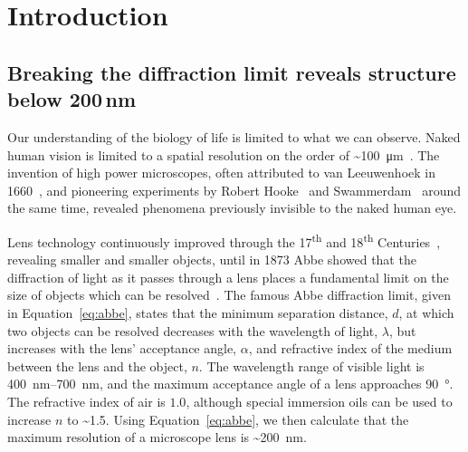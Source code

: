 
\chapter{Introduction}  %

\ifpdf
    \graphicspath{{Chapter1/Figs/Raster/}{Chapter1/Figs/PDF/}{Chapter1/Figs/}}
\else
    \graphicspath{{Chapter1/Figs/Vector/}{Chapter1/Figs/}}
\fi

\section{Breaking the diffraction limit reveals structure below 200\,nm}
Our understanding of the biology of life is limited to what we can observe. 
Naked human vision is limited to a spatial resolution on the order of \textasciitilde\SI{100}{\micro\metre}~\cite{devalois1990spatial}.
The invention of high power microscopes, often attributed to van Leeuwenhoek in 1660~\cite{van1800select}, and pioneering experiments by Robert Hooke~\cite{hooke1667micrographia} and Swammerdam~\cite{swammerdam1758book} around the same time, revealed phenomena previously invisible to the naked human eye. 

Lens technology continuously improved through the 17\textsuperscript{th} and 18\textsuperscript{th} Centuries~\cite{dollond1753xiv, daumas1972scientific}, revealing smaller and smaller objects, until in 1873 Abbe showed that the diffraction of light as it passes through a lens places a fundamental limit on the size of objects which can be resolved~\cite{abbe1873beitrage}. The famous Abbe diffraction limit, given in Equation~\ref{eq:abbe}, states that the minimum separation distance, $d$, at which two objects can be resolved decreases with the wavelength of light, $\lambda$, but increases with the lens' acceptance angle, $\alpha$, and refractive index of the medium between the lens and the object, $n$. The wavelength range of visible light is \SIrange[range-phrase=--]{400}{700}{\nano\metre}, and the maximum acceptance angle of a lens approaches \SI{90}{\degree}. The refractive index of air is $1.0$, although special immersion oils can be used to increase $n$ to \textasciitilde\num{1.5}. Using Equation~\ref{eq:abbe}, we then calculate that the maximum resolution of a microscope lens is \textasciitilde\SI{200}{\nano\metre}. 


